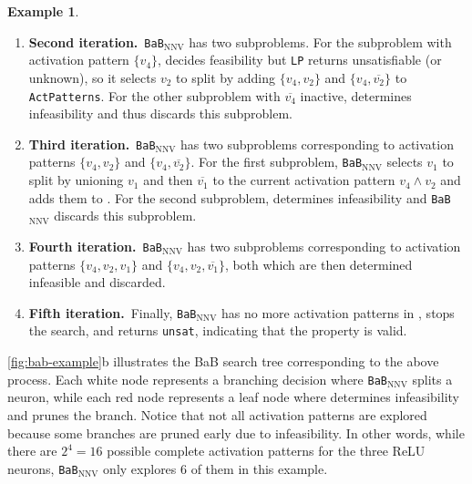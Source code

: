 \documentclass[oneside,11pt,dvipsnames]{book}
\numberwithin{equation}{section}
\theoremstyle{definition}
\newtheorem{example}{Example}[section]
\theoremstyle{remark}
\newcommand{\mycode}[1]{\textrm{\texttt{#1}}}
\newcommand{\bab}{\texttt{BaB$_{\text{NNV}}$}}
\newcommand{\unsat}{\texttt{unsat}}
\begin{document}
\begin{example}
\begin{enumerate}
\bab{} then randomly selects a neuron to split (\Decide). Assume that it chooses $v_4$ to split, i.e., the problem spawns two independent subproblems: one with $v_4$ active and the other with $v_4$ inactive.
It does so by unioning $\{v_4\}$ and $\{\overline{v_4}\}$ with $\sigma_i$ and adds both new activation patterns to \problems. 
Next, \bab{} loops back to process the next activation pattern.
Thus, each of the two new subproblem is simpler than the original one because we have fixed the status of one neuron ($v_4$), which hopefully makes \Deduce{} and \mycode{LP} more precise and efficient in the next iterations.


\item \textbf{Second iteration.}~\bab{} has two subproblems. For the subproblem with activation pattern $\{v_4\}$, \Deduce decides feasibility but \mycode{LP} returns unsatisfiable (or unknown),
so it selects $v_2$ to split by adding $\{v_4, v_2\}$ and $\{v_4, \overline{v_2}\}$ to \texttt{ActPatterns}.
For the other subproblem with $\overline{v_4}$ inactive, \Deduce determines infeasibility and thus discards this subproblem.

\item \textbf{Third iteration.}~\bab{} has two subproblems corresponding to activation patterns $\{v_4, v_2\}$ and $\{v_4, \overline{v_2}\}$. For the first subproblem, \bab{} selects $v_1$ to split by unioning $v_1$ and then $\overline{v_1}$ to the current activation pattern $v_4 \land v_2$ and adds them to \problems. For the second subproblem, \Deduce determines infeasibility and \bab{} discards this subproblem.

\item \textbf{Fourth iteration.}~\bab{} has two subproblems corresponding to activation patterns $\{v_4, v_2, v_1\}$ and $\{v_4, v_2, \overline{v_1}\}$, both which are then determined infeasible and discarded.

\item \textbf{Fifth iteration.}~Finally, \bab{} has no more activation patterns in \problems, stops the search, and returns \unsat{}, indicating that the property is valid.
\end{enumerate}

\autoref{fig:bab-example}b illustrates the BaB search tree corresponding to the above process. Each white node represents a branching decision where \bab{} splits a neuron, while each red node represents a leaf node where \Deduce determines infeasibility and prunes the branch. Notice that not all activation patterns are explored because some branches are pruned early due to infeasibility. In other words, while there are $2^4=16$ possible complete activation patterns for the three ReLU neurons, \bab{} only explores 6 of them in this example.
\end{example}
\end{document}
